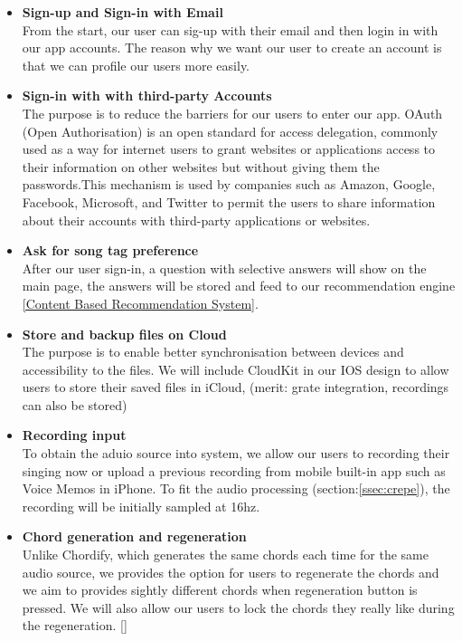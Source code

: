 \begin{itemize}

\item \textbf{Sign-up and Sign-in with Email}
\\From the start, our user can sig-up with their email and then login in with our app accounts. The reason why we want our user to create an account is that we can profile our users more easily.

\item \textbf{Sign-in with with third-party Accounts}
\\ The purpose is to reduce the barriers for our users to enter our app. OAuth (Open Authorisation) is an open standard for access delegation, commonly used as a way for internet users to grant websites or applications access to their information on other websites but without giving them the passwords.This mechanism is used by companies such as Amazon, Google, Facebook, Microsoft, and Twitter to permit the users to share information about their accounts with third-party applications or websites.

\item \textbf{Ask for song tag preference}
\\After our user sign-in, a question with selective answers will show on the main page, the answers will be stored and feed to our recommendation engine \autoref{Content Based Recommendation System}.

\item \textbf{Store and backup files on Cloud}
\\The purpose is to enable better synchronisation between devices and accessibility to the files. 
We will include CloudKit in our IOS design to allow users to store their saved files in iCloud, (merit: grate integration, recordings can also be stored)

\item \textbf{Recording input}
\\ To obtain the aduio source into system, we allow our users to recording their singing now or upload a previous recording 
from mobile built-in app such as Voice Memos in iPhone. To fit the audio processing (section:\ref{ssec:crepe}), the recording will be initially sampled at 16hz.

\item \textbf{Chord generation and regeneration}
\\Unlike Chordify, which generates the same chords each time for the same audio source, we provides the option for users to regenerate the chords and we aim to provides sightly different chords when regeneration button is pressed. 
We will also allow our users to lock the chords they really like during the regeneration. \autoref{}


\end{itemize}
